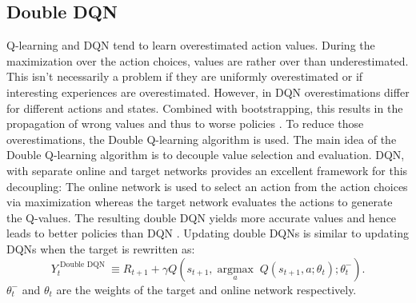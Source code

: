 \subsection{Double DQN\anna}
Q-learning  and DQN tend to learn overestimated action values. During the maximization over the action choices, values are rather over than underestimated.
This isn't necessarily a problem if they are uniformly overestimated or if interesting experiences are overestimated. However, in DQN overestimations differ for different actions and states. Combined with bootstrapping, this results in the propagation of wrong values and thus to worse policies \cite{DBLP:journals/corr/HasseltGS15}. To reduce those overestimations, the Double Q-learning algorithm \cite{DBLP:journals/corr/HasseltGS15} is used. 
The main idea of the Double Q-learning algorithm is to decouple value selection and evaluation.
DQN, with separate online and target networks provides an excellent framework for this decoupling:
The online network is used to select an action from the action choices via maximization whereas the target network evaluates the actions to generate the Q-values.
The resulting double DQN yields more accurate values and hence leads to better policies than DQN \cite{DBLP:journals/corr/HasseltGS15}.
Updating double DQNs is similar to updating DQNs when the target is rewritten as:
\begin{equation}\label{eq:DDQN-target}
Y_{t}^{\text { Double DQN }} \equiv R_{t+1}+\gamma Q\left(s_{t+1}, \underset{a}{\operatorname{argmax}}\; Q\left(s_{t+1}, a ; \theta_{t}\right); \theta_{t}^{-}\right).
\end{equation}
$\theta_{t}^{-}$ and $\theta_{t}$ are the weights of the target and online network respectively.
